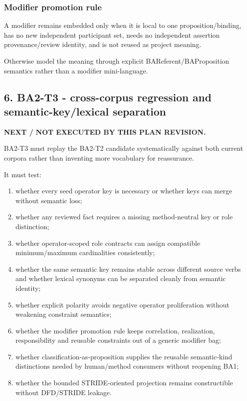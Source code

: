 \documentclass[
  10pt,
  letterpaper,
]{article}
\providecommand{\tightlist}{%
  \setlength{\itemsep}{0pt}\setlength{\parskip}{0pt}}
\begin{document}
\subsubsection{Modifier promotion rule}\label{modifier-promotion-rule}

A modifier remains embedded only when it is local to one
proposition/binding, has no new independent participant set, needs no
independent assertion provenance/review identity, and is not reused as
project meaning.

Otherwise model the meaning through explicit BAReferent/BAProposition
semantics rather than a modifier mini-language.

\subsection{6. BA2-T3 - cross-corpus regression and semantic-key/lexical
separation}\label{ba2-t3---cross-corpus-regression-and-semantic-keylexical-separation}

\textbf{NEXT / NOT EXECUTED BY THIS PLAN REVISION.}

BA2-T3 must replay the BA2-T2 candidate systematically against both
current corpora rather than inventing more vocabulary for reassurance.

It must test:

\begin{enumerate}
\def\labelenumi{\arabic{enumi}.}
\tightlist
\item
  whether every seed operator key is necessary or whether keys can merge
  without semantic loss;
\item
  whether any reviewed fact requires a missing method-neutral key or
  role distinction;
\item
  whether operator-scoped role contracts can assign compatible
  minimum/maximum cardinalities consistently;
\item
  whether the same semantic key remains stable across different source
  verbs and whether lexical synonyms can be separated cleanly from
  semantic identity;
\item
  whether explicit polarity avoids negative operator proliferation
  without weakening constraint semantics;
\item
  whether the modifier promotion rule keeps correlation, realization,
  responsibility and reusable constraints out of a generic modifier bag;
\item
  whether classification-as-proposition supplies the reusable
  semantic-kind distinctions needed by human/method consumers without
  reopening BA1;
\item
  whether the bounded STRIDE-oriented projection remains constructible
  without DFD/STRIDE leakage.
\end{enumerate}
\end{document}
